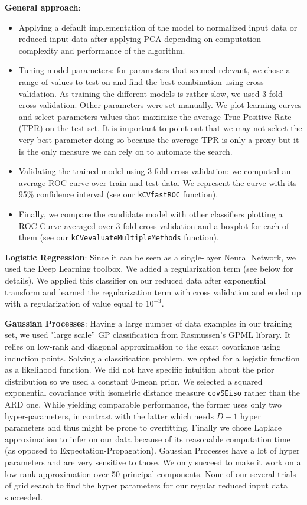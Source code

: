 \documentclass{article}
\begin{document}
  \textbf{General approach}:
   	\begin{itemize}
	   	\item Applying a default implementation of the model to normalized input data or reduced input data after applying PCA depending on computation complexity and performance of the algorithm.
    		\item Tuning model parameters: for parameters that seemed relevant, we chose a range of values to test on and find the best combination using cross validation. As training the different models is rather slow, we used 3-fold cross validation. Other parameters were set manually. We plot learning curves and select parameters values that maximize the average True Positive Rate (TPR) on the test set. It is important to point out that we may not select the very best parameter doing so because the average TPR is only a proxy but it is the only measure we can rely on to automate the search.
		  \item Validating the trained model using 3-fold cross-validation: we computed an average ROC curve over train and test data. We represent the curve with its 95\% confidence interval (see our \texttt{kCVfastROC} function).
  		\item Finally, we compare the candidate model with other classifiers plotting a ROC Curve averaged over 3-fold cross validation and a boxplot for each of them (see our \texttt{kCVevaluateMultipleMethods} function).
	\end{itemize}

  \textbf{Logistic Regression}: Since it can be seen as a single-layer Neural Network, we used the Deep Learning toolbox. We added a regularization term (see below for details). We applied this classifier on our reduced data after exponential transform and learned the regularization term with cross validation and ended up with a regularization of value equal to $10^{-3}$.

  \textbf{Gaussian Processes}: Having a large number of data examples in our training set, we used "large scale'' GP classification from Rasmussen's GPML library. It relies on low-rank and diagonal approximation to the exact covariance using induction points. Solving a classification problem, we opted for a logistic function as a likelihood function. We did not have specific intuition about the prior distribution so we used a constant 0-mean prior. We selected a squared exponential covariance with isometric distance measure \texttt{covSEiso} rather than the ARD one. While yielding comparable performance, the former uses only two hyper-parameters, in contrast with the latter which needs $D+1$ hyper parameters and thus might be prone to overfitting. Finally we chose Laplace approximation to infer on our data because of its reasonable computation time (as opposed to Expectation-Propagation). Gaussian Processes have a lot of hyper parameters and are very sensitive to those. We only succeed to make it work on a low-rank approximation over 50 principal components. None of our several trials of grid search to find the hyper parameters for our regular reduced input data succeeded.
\end{document}
